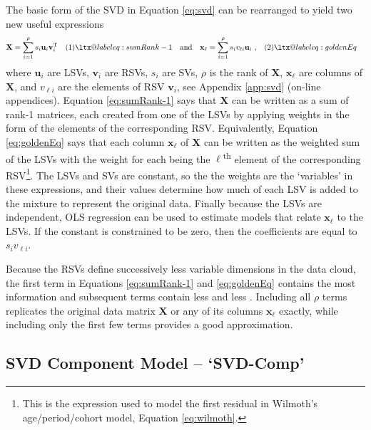 \documentclass[11pt]{article}
\makeatletter
\newcommand{\mbf}{\mathbf}
\newcommand\Label[1]{&\refstepcounter{equation}(\theequation)\ltx@label{#1}&}
\makeatother
\begin{document}
The basic form of the SVD in Equation \ref{eq:svd} can be rearranged to yield two new useful expressions %
%
\begin{align*}
\mathbf{X} &= \sum_{i=1}^{\rho} s_{i} \mbf{u}_{i} \mbf{v}_{i}^\text{T} \Label{eq:sumRank-1} &
\mbox{and} & &
\mbf{x}_{\ell} &= \sum_{i=1}^{\rho} s_{i} v_{\ell i} \mbf{u}_{i} \ , \Label{eq:goldenEq}
\end{align*}%
%
where $\mbf{u}_i$ are LSVs, $\mbf{v}_i$ are RSVs, $s_i$ are SVs, $\rho$ is the rank of $\mbf{X}$, $\mbf{x}_\ell$ are columns of $\mbf{X}$, and $v_{\ell i}$ are the elements of RSV $\mbf{v}_i$, see Appendix \ref{app:svd} (on-line appendices).  Equation \ref{eq:sumRank-1} says that $\mbf{X}$ can be written as a sum of rank-1 matrices, each created from one of the LSVs by applying weights in the form of the elements of the corresponding RSV.  Equivalently, Equation \ref{eq:goldenEq} says that each column $\mbf{x}_\ell$ of $\mbf{X}$ can be written as the weighted sum of the LSVs with the weight for each being the $\ell$\textsuperscript{th} element of the corresponding RSV\footnote{This is the expression used to model the first residual in Wilmoth's age/period/cohort model, Equation \ref{eq:wilmoth}.}.  The LSVs and SVs are constant, so the the weights are the `variables' in these expressions, and their values determine how much of each LSV is added to the mixture to represent the original data.  Finally because the LSVs are independent, OLS regression can be used to estimate models that relate $\mbf{x}_\ell$ to the LSVs. If the constant is constrained to be zero, then the coefficients are equal to $s_iv_{\ell i}$.

Because the RSVs define successively less variable dimensions in the data cloud, the first term in Equations \ref{eq:sumRank-1} and \ref{eq:goldenEq} contains the most information and subsequent terms contain less and less \citep{golub1987generalization}.  Including all $\rho$ terms replicates the original data matrix $\mbf{X}$ or any of its columns $\mbf{x}_\ell$ exactly, while including only the first few terms provides a good approximation.      


\subsection{SVD Component Model -- `SVD-Comp'}
\end{document}
